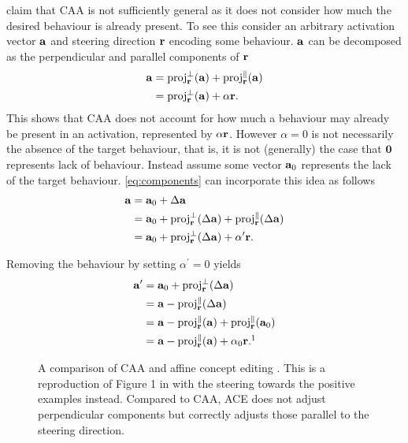 \citet{ace} claim that CAA \citep{caa} is not sufficiently general as it does not consider how much the desired behaviour is already present.
To see this consider an arbitrary activation vector $\mathbf{a}$ and steering direction $\mathbf{r}$ encoding some behaviour.
$\mathbf{a}$ can be decomposed as the perpendicular and parallel components of $\mathbf{r}$
\begin{equation}
    \label{eq:components}
    \begin{aligned}
        \mathbf{a} &= \text{proj}_{\mathbf{r}}^{\perp}(\mathbf{a}) + \text{proj}_{\mathbf{r}}^{\parallel}(\mathbf{a}) \\
            &= \text{proj}_{\mathbf{r}}^{\perp}(\mathbf{a}) + \alpha\mathbf{r}.
    \end{aligned}
\end{equation}
This shows that CAA \citep{caa} does not account for how much a behaviour may already be present in an activation, represented by $\alpha\mathbf{r}$.
However $\alpha = 0$ is not necessarily the absence of the target behaviour, that is, it is not (generally) the case that $\mathbf{0}$ represents lack of behaviour.
Instead assume some vector $\mathbf{a}_0$ represents the lack of the target behaviour.
\cref{eq:components} can incorporate this idea as follows
\begin{align*}
    \mathbf{a} &= \mathbf{a}_0 + \Delta\mathbf{a} \\
        &= \mathbf{a}_0 + \text{proj}_{\mathbf{r}}^{\perp}(\Delta\mathbf{a}) + \text{proj}_{\mathbf{r}}^{\parallel}(\Delta\mathbf{a}) \\
        &= \mathbf{a}_0 + \text{proj}_{\mathbf{r}}^{\perp}(\Delta\mathbf{a}) + \alpha^\prime\mathbf{r}.
\end{align*}

Removing the behaviour by setting $\alpha^\prime = 0$ yields
\begin{align*}
    \va^\prime &= \va_0 + \text{proj}_\vr^{\perp}(\Delta\va) \\
               &= \va - \text{proj}_\vr^{\parallel}(\Delta\va) \\
               &= \va - \text{proj}_\vr^{\parallel}(\va) + \text{proj}_\vr^{\parallel}(\va_0) \\
               &= \va - \text{proj}_\vr^{\parallel}(\va) + \alpha_0\vr.\footnotemark[1]
\end{align*}

\begin{figure}
    \centering
    \captionsetup{width=.9\textwidth}
    
    \caption{A comparison of CAA \citep{caa} and affine concept editing \citep{ace}. This is a reproduction of Figure 1 in \citet{ace} with the steering towards the positive examples instead. Compared to CAA, ACE does not adjust perpendicular components but correctly adjusts those parallel to the steering direction.}
    \label{fig:ace}
\end{figure}

